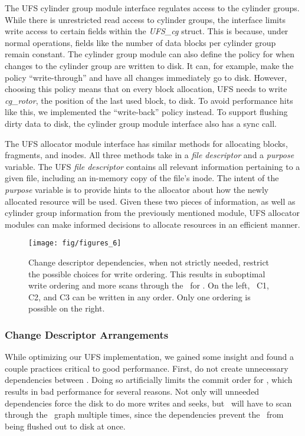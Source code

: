 The UFS cylinder group module interface regulates access to the cylinder
groups. While there is unrestricted read access to cylinder groups, the
interface limits write access to certain fields within the \emph{UFS\_cg}
struct. This is because, under normal operations, fields like the number of
data blocks per cylinder group remain constant. The cylinder group module can
also define the policy for when changes to the cylinder group are written to
disk. It can, for example, make the policy ``write-through'' and have all
changes immediately go to disk. However, choosing this policy means that on
every block allocation, UFS needs to write \emph{cg\_rotor}, the position of
the last used block, to disk. To avoid performance hits like this, we
implemented the ``write-back'' policy instead. To support flushing dirty data
to disk, the cylinder group module interface also has a sync call.

The UFS allocator module interface has similar methods for allocating blocks,
fragments, and inodes. All three methods take in a \emph{file descriptor} and a
\emph{purpose} variable. The UFS \emph{file descriptor} contains all relevant
information pertaining to a given file, including an in-memory copy of the
file's inode. The intent of the \emph{purpose} variable is to provide hints to
the allocator about how the newly allocated resource will be used.  Given these
two pieces of information, as well as cylinder group information from the
previously mentioned module, UFS allocator modules can make informed decisions
to allocate resources in an efficient manner.

\begin{figure}[htb]
  \centering
  \texttt{[image: fig/figures\_6]}
  \caption{\label{fig:chdescarrange} Change descriptor dependencies, when
  not strictly needed, restrict the possible choices for write ordering.
  This results in suboptimal write ordering and more scans through the
  \chdescs\ for \Kudos. On the left, \chdescs\ C1, C2, and C3 can be written
  in any order. Only one ordering is possible on the right.}
\end{figure}

\subsubsection {Change Descriptor Arrangements}
While optimizing our UFS implementation, we gained some insight and found a
couple practices critical to good performance. First, do not create unnecessary
dependencies between \chdescs. Doing so artificially limits the commit order
for \chdescs, which results in bad performance for several reasons. Not only
will unneeded dependencies force the disk to do more writes and seeks, but
\Kudos\ will have to scan through the \chdesc\ graph multiple times, since the
dependencies prevent the \chdescs\ from being flushed out to disk at once.

